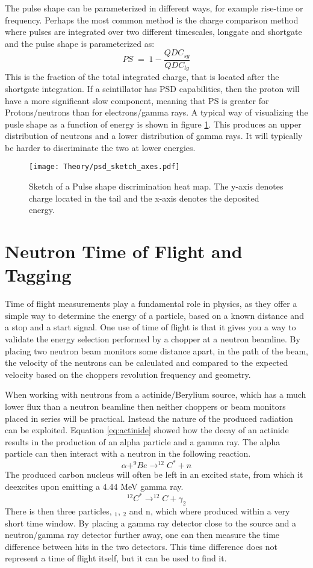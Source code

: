\documentclass[main.tex]{subfiles}
\begin{document}
The pulse shape can be parameterized in different ways, for example rise-time or frequency. Perhaps the most common method is the charge comparison method where pulses are integrated over two different timescales, longgate and shortgate and the pulse shape is parameterized as:
\begin{equation}
	PS \; = \; 1-\frac{QDC_{sg}}{QDC_{lg}}
	\label{eq:ps}
\end{equation}
This is the fraction of the total integrated charge, that is located after the shortgate integration. If a scintillator has PSD capabilities, then the proton will have a more significant slow component, meaning that PS is greater for Protons/neutrons than for electrons/gamma rays. A typical way of visualizing the pusle shape as a function of energy is shown in figure \ref{fig:psd_sketch}. This produces an upper distribution of neutrons and a lower distribution of gamma rays. It will typically be harder to discriminate the two at lower energies.
\begin{figure}[ht]
    \centering
        \texttt{[image: Theory/psd\_sketch\_axes.pdf]}
        \caption[Pulse shape discrimination sketch]{Sketch of a Pulse shape discrimination heat map. The y-axis denotes charge located in the tail and the x-axis denotes the deposited energy.}
    \label{fig:psd_sketch} 
\end{figure}


\section{Neutron Time of Flight and Tagging}
Time of flight measurements play a fundamental role in physics, as they offer a simple way to determine the energy of a particle, based on a known distance and a stop and a start signal. One use of time of flight is that it gives you a way to validate the energy selection performed by a chopper at a neutron beamline. By placing two neutron beam monitors some distance apart, in the path of the beam, the velocity of the neutrons can be calculated and compared to the expected velocity based on the choppers revolution frequency and geometry.

When working with neutrons from a actinide/Berylium source, which has a much lower flux than a neutron beamline then neither choppers or beam monitors placed in series will be practical. Instead the nature of the produced radiation can be exploited. Equation \ref{eq:actinide} showed how the decay of an actinide results in the production of an alpha particle and a gamma ray. The alpha particle can then interact with a neutron in the following reaction.
$$\alpha+^{9}Be\rightarrow^{12}C^{*}+n$$
The produced carbon nucleus will often be left in an excited state, from which it deexcites upon emitting a 4.44 MeV gamma ray. 
$$^{12}C^ {*}\rightarrow^{12}C+\gamma_2$$
There is then three particles, \textgamma$_\text{1}$, \textgamma$_\text{2}$ and n, which where produced within a very short time window. By placing a gamma ray detector close to the source and a neutron/gamma ray detector further away, one can then measure the time difference between hits in the two detectors. This time difference does not represent a time of flight itself, but it can be used to find it. 
\end{document}

